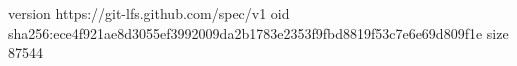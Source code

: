 version https://git-lfs.github.com/spec/v1
oid sha256:ece4f921ae8d3055ef3992009da2b1783e2353f9fbd8819f53c7e6e69d809f1e
size 87544
